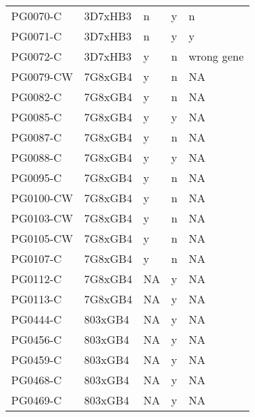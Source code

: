 \begin{table}[]
\begin{tabular}{@{}lllll@{}}
PG0070-C  & 3D7xHB3 & n                            & y             & n                        \\
PG0071-C  & 3D7xHB3 & n                            & y             & y                        \\
PG0072-C  & 3D7xHB3 & y                            & n             & wrong gene               \\
PG0079-CW & 7G8xGB4 & y                            & n             & NA                       \\
PG0082-C  & 7G8xGB4 & y                            & n             & NA                       \\
PG0085-C  & 7G8xGB4 & y                            & y             & NA                       \\
PG0087-C  & 7G8xGB4 & y                            & n             & NA                       \\
PG0088-C  & 7G8xGB4 & y                            & y             & NA                       \\
PG0095-C  & 7G8xGB4 & y                            & n             & NA                       \\
PG0100-CW & 7G8xGB4 & y                            & n             & NA                       \\
PG0103-CW & 7G8xGB4 & y                            & n             & NA                       \\
PG0105-CW & 7G8xGB4 & y                            & n             & NA                       \\
PG0107-C  & 7G8xGB4 & y                            & n             & NA                       \\
PG0112-C  & 7G8xGB4 & NA                           & y             & NA                       \\
PG0113-C  & 7G8xGB4 & NA                           & y             & NA                       \\
PG0444-C  & 803xGB4 & NA                           & y             & NA                       \\
PG0456-C  & 803xGB4 & NA                           & y             & NA                       \\
PG0459-C  & 803xGB4 & NA                           & y             & NA                       \\
PG0468-C  & 803xGB4 & NA                           & y             & NA                       \\
PG0469-C  & 803xGB4 & NA                           & y             & NA                       \\ \bottomrule
\end{tabular}
\end{table}

